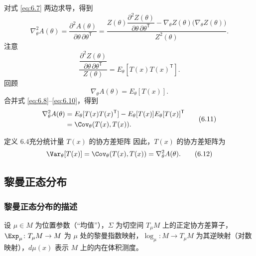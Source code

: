 对式 \eqref{eq:6.7} 两边求导，得到
\begin{equation*}
  \nabla_\theta^2 A(\theta)=\frac{\partial^2 A(\theta)}{\partial\theta\,\partial\theta^{\mathsf T}}
  =\frac{Z(\theta)\dfrac{\partial^2Z(\theta)}{\partial\theta\,\partial\theta^{\mathsf T}}
    -\nabla_\theta Z(\theta)\bigl(\nabla_\theta Z(\theta)\bigr)}{Z^2(\theta)}.
  \tag{6.8}\label{eq:6.8}
\end{equation*}
注意
\begin{equation*}
  \frac{\dfrac{\partial^2Z(\theta)}{\partial\theta\,\partial\theta^{\mathsf T}}}{Z(\theta)}
  =E_\theta[T(x)T(x)^{\mathsf T}].
  \tag{6.9}\label{eq:6.9}
\end{equation*}
回顾
\begin{equation*}
  \nabla_\theta A(\theta)=E_\theta[T(x)].
  \tag{6.10}\label{eq:6.10}
\end{equation*}
合并式 \eqref{eq:6.8}–\eqref{eq:6.10}，得到
\begin{equation*}
  \begin{aligned}
    \nabla_\theta^2 A(\theta)
      &=E_\theta[T(x)T(x)^{\mathsf T}]-E_\theta[T(x)]E_\theta[T(x)]^{\mathsf T}\\
      &=\Cov_\theta(T(x),T(x)).
  \end{aligned}
  \tag{6.11}\label{eq:6.11}
\end{equation*}

\begin{statement}{定义 6.4}{充分统计量 $T(x)$ 的协方差矩阵}
因此，$T(x)$ 的协方差矩阵为
\begin{equation*}
  \Var_\theta[T(x)]=\Cov_\theta(T(x),T(x))=\nabla_\theta^2 A(\theta).
  \tag{6.12}\label{eq:6.12}
\end{equation*}
\end{statement}

\subsection{黎曼正态分布}

\subsubsection{黎曼正态分布的描述}

设 $\mu\in M$ 为位置参数（“均值”），$\Sigma$ 为切空间 $T_\mu M$ 上的正定协方差算子，$\Exp_\mu\colon T_\mu M\to M$ 为 $\mu$ 处的黎曼指数映射，$\log_\mu\colon M\to T_\mu M$ 为其逆映射（对数映射），$d\mu(x)$ 表示 $M$ 上的内在体积测度。

